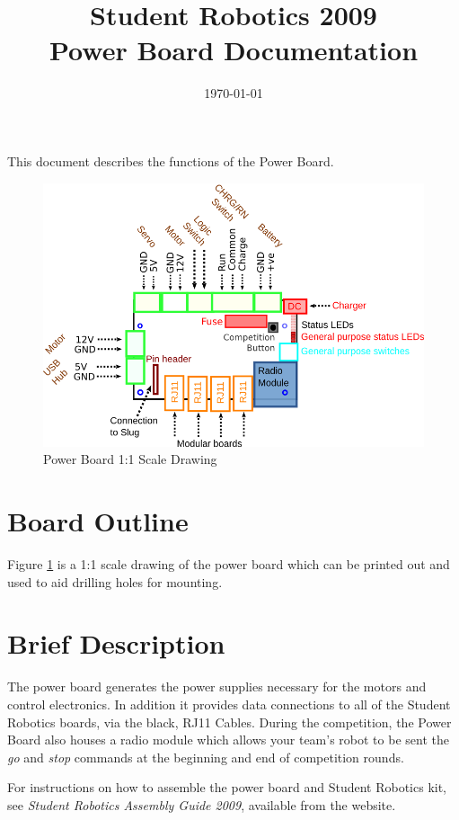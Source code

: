 \documentclass[a4paper, 12pt]{article}
\title {Student Robotics 2009\\ Power Board Documentation}
\date{\today}
\begin{document}
\maketitle

\noindent This document describes the functions of the Power Board. 

\begin{figure}
\centering
\includegraphics[scale=1, angle=90]{outline}
\caption{Power Board 1:1 Scale Drawing}
\label{fig:outline}
\end{figure}


\section{Board Outline}
Figure \ref{fig:outline} is a 1:1 scale drawing of the power board which can be printed out and used to aid drilling holes for mounting.
\label{sec:outline}

\section{Brief Description}
The power board generates the power supplies necessary for the motors and control electronics. In addition it provides data connections to all of the Student Robotics boards, via the black, RJ11 Cables. During the competition, the Power Board also houses a radio module which allows your team's robot to be sent the \textit{go} and \textit{stop} commands at the beginning and end of competition rounds.

For instructions on how to assemble the power board and Student Robotics kit, see \textit{Student Robotics Assembly Guide 2009}, available from the website.
\end{document}
